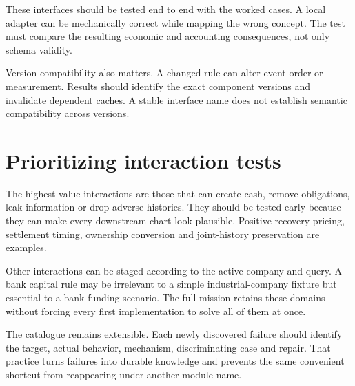 These interfaces should be tested end to end with the worked cases. A local adapter can be mechanically correct while mapping the wrong concept. The test must compare the resulting economic and accounting consequences, not only schema validity.

Version compatibility also matters. A changed rule can alter event order or measurement. Results should identify the exact component versions and invalidate dependent caches. A stable interface name does not establish semantic compatibility across versions.

\section{Prioritizing interaction tests}
The highest-value interactions are those that can create cash, remove obligations, leak information or drop adverse histories. They should be tested early because they can make every downstream chart look plausible. Positive-recovery pricing, settlement timing, ownership conversion and joint-history preservation are examples.

Other interactions can be staged according to the active company and query. A bank capital rule may be irrelevant to a simple industrial-company fixture but essential to a bank funding scenario. The full mission retains these domains without forcing every first implementation to solve all of them at once.

The catalogue remains extensible. Each newly discovered failure should identify the target, actual behavior, mechanism, discriminating case and repair. That practice turns failures into durable knowledge and prevents the same convenient shortcut from reappearing under another module name.
